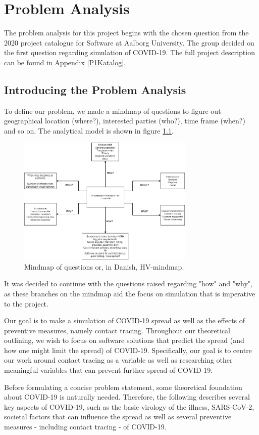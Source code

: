 \chapter{Problem Analysis} \label{chap:problemanalyse}

The problem analysis for this project begins with the chosen question from the 2020 project catalogue for Software at Aalborg University. The group decided on the first question regarding simulation of COVID-19. The full project description can be found in Appendix \vref{P1Katalog}.

\section{Introducing the Problem Analysis}
To define our problem, we made a mindmap of questions to figure out geographical location (where?), interested parties (who?), time frame (when?) and so on. The analytical model is shown in figure \ref{fig:HV-mindmap}.

\begin{figure}[H]
    \centering
    \includegraphics[width=0.75\textwidth]{0_billeder/HV-Mindmap.png}
    \caption{Mindmap of questions or, in Danish, HV-mindmap.}
    \label{fig:HV-mindmap}
\end{figure}

It was decided to continue with the questions raised regarding "how" and "why", as these branches on the mindmap aid the focus on simulation that is imperative to the project.

Our goal is to make a simulation of COVID-19 spread as well as the effects of preventive measures, namely contact tracing. Throughout our theoretical outlining, we wish to focus on software solutions that predict the spread (and how one might limit the spread) of COVID-19. Specifically, our goal is to centre our work around contact tracing as a variable as well as researching other meaningful variables that can prevent further spread of COVID-19.

Before formulating a concise problem statement, some theoretical foundation about COVID-19 is naturally needed. Therefore, the following describes several key aspects of COVID-19, such as the basic virology of the illness, SARS-CoV-2, societal factors that can influence the spread as well as several preventive measures - including contact tracing - of COVID-19.